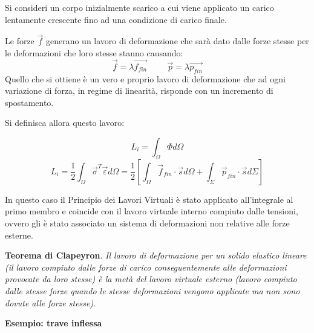 \documentclass{article}
\begin{document}
\begin{adjustwidth}{2in}{}
	\newpage

	Si consideri un corpo inizialmente scarico a cui viene applicato un carico lentamente
	crescente fino ad una condizione di carico finale. \newline 
	
	Le forze $\vec{f}$ generano un lavoro di deformazione che sarà dato dalle forze stesse per le deformazioni che loro stesse stanno causando:
	\[
	\vec{f} = \lambda \vec{f_{fin}} \hspace{1cm} \vec{p} = \lambda \vec{p_{fin}}
	\]
	Quello che si ottiene è un vero e proprio lavoro di deformazione che ad ogni variazione di forza, in regime di linearità, risponde con un incremento di spostamento. \newline 
	
	Si definisca allora questo lavoro:
	
	\[
	L_i = \int_{\Omega}\Phi d\Omega
	\]
	\[
	L_i = \dfrac{1}{2}\int_{\Omega}\vec{\sigma}^T\vec{\varepsilon} d\Omega = \dfrac{1}{2}\left[ \int_{\Omega} \vec{f}_{fin} \cdot \vec{s} d\Omega + \int_{\Sigma}\vec{p}_{fin} \cdot \vec{s} d\Sigma 
	\right] 	\]

	In questo caso il Principio dei Lavori Virtuali è stato applicato all’integrale al primo membro e coincide con il lavoro virtuale interno compiuto dalle tensioni, ovvero gli è stato associato un sistema di deformazioni non relative alle forze esterne. \newline 
	
	\textbf{Teorema di Clapeyron}. \textit{Il lavoro di deformazione per un solido elastico lineare (il lavoro
		compiuto dalle forze di carico conseguentemente alle deformazioni provocate da loro stesse) è
		la metà del lavoro virtuale esterno (lavoro compiuto dalle stesse forze quando le stesse
		deformazioni vengono applicate ma non sono dovute alle forze stesse).}  
	
	
\newpage	

	\textbf{{\large }Esempio: trave inflessa} \newline 
	

\end{adjustwidth}
\end{document}
